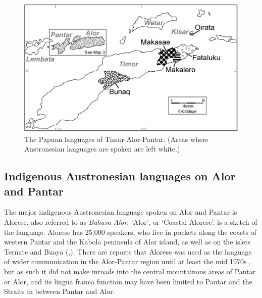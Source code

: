 


\begin{figure}
\includegraphics[width=\textwidth]{figures/klamer_ch1_fig3.png}

\caption{The Papuan languages of Timor-Alor-Pantar. (Areas where Austronesian languages are spoken are left white.)}
\label{fig:1:Map3}
\end{figure} 






\subsection{Indigenous Austronesian languages on Alor and Pantar} \label{sec:1:2.2}
The major indigenous Austronesian language spoken on Alor and Pantar is Alorese, also referred to as \textit{Bahasa Alor}, `Alor', or `Coastal Alorese'. \citet{Klamer2011} is a sketch of the language. Alorese has 25,000 speakers, who live in pockets along the coasts of western Pantar and the Kabola peninsula of Alor island, as well as on the islets Ternate and Buaya (\citealt[8-9]{Stokhof1975},\citealt{GrimesEtAl1997,Lewis2009}). There are reports that Alorese was used as the language of wider communication in the Alor-Pantar region until at least the mid 1970s \citep[see][8]{Stokhof1975}, but as such it did not make inroads into the central mountainous areas of Pantar or Alor, and its lingua franca function may have been limited to Pantar and the Straits in between Pantar and Alor.

